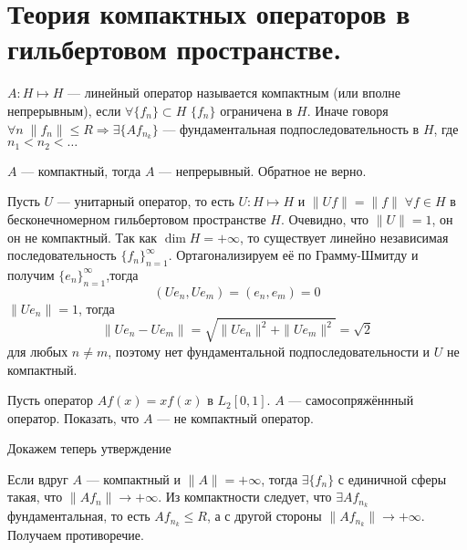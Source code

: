 \documentclass[12pt]{article}
\begin{document}
\section*{Теория компактных операторов в гильбертовом пространстве.}
\begin{Opr}
    $A : H \mapsto H$ --- линейный оператор называется компактным (или вполне 
    непрерывным), если $\forall \{f_n\} \subset
    H$ $\{f_n\}$ ограничена в $H$.
    Иначе говоря $\forall n\; \|f_n\| \le R \Rightarrow \exists \{Af_{n_k}\}$ 
    --- фундаментальная подпоследовательность в $H$, 
    где $n_1 < n_2 < \dots$
\end{Opr}
\begin{Utv}
    $A$ --- компактный, тогда $A$ --- непрерывный.
    Обратное не верно. 
\end{Utv}
\begin{Prim}
    Пусть $U$ --- унитарный оператор, то есть $U : H \mapsto H$ и $\|Uf\| = \|
    f\|\; \forall f \in H$ в
    бесконечномерном гильбертовом пространстве $H$.
    Очевидно, что $\|U\| = 1$, он он не компактный.
    Так как $\dim H = +\infty$, то существует линейно независимая 
    последовательность $\{f_n\}_{n = 1}^{\infty}$.
    Ортагонализируем её по Грамму-Шмитду и получим $\{e_n\}_{n = 1}^{\infty}
    $,тогда
    $$
    (U e_n, U e_m) = (e_n, e_m) = 0
    $$
    $\|U e_n\| = 1$, тогда
    $$
    \|U e_n - U e_m\| = \sqrt{\|U e_n\|^2 + \|U e_m\|^2} = \sqrt{2}
    $$
    для любых $n \ne m$, поэтому нет фундаментальной подпоследовательности и 
    $U$ не компактный.
\end{Prim}
\begin{Upr}
    Пусть оператор $A f(x) = x f(x)$ в $L_2[0,1]$.
    $A$ --- самосопряжённный оператор.
    Показать, что $A$ --- не компактный оператор.
\end{Upr}

Докажем теперь утверждение
\begin{Proof}
    Если вдруг $A$ --- компактный и $\|A\| = +\infty$, тогда $\exists \{f_n\}$ 
    с единичной сферы такая, что $\|A f_n\| \to 
    +\infty$.
    Из компактности следует, что $\exists A f_{n_k}$ фундаментальная, то есть 
    $A f_{n_k} \le R$, а с другой стороны 
    $\|A f_{n_k}\| \to +\infty$.
    Получаем противоречие.
\end{Proof}
 
\end{document}
